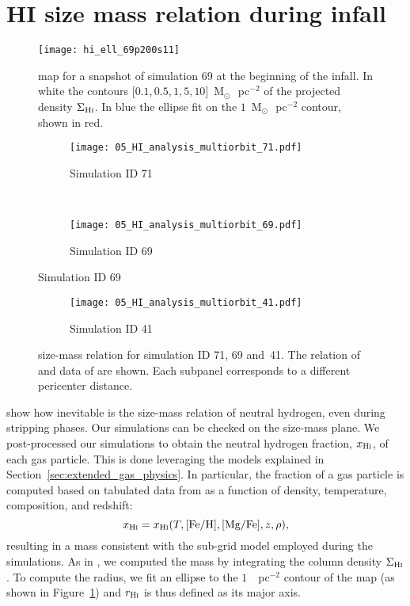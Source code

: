 \section{HI size mass relation during infall}
\begin{figure}[ht]
  \centering
  \texttt{[image: hi\_ell\_69p200s11]}
  \caption{\Hi{} map for a snapshot of simulation 69 at the beginning of the infall.
    In white the contours [$0.1, 0.5, 1, 5, 10$]~M$_\odot\,$~pc$^{-2}$ of the projected \Hi{} density $\Sigma_{\text{H\textsc{i}{}}}$.
    In blue the ellipse fit on the $1$~M$_\odot\,$~pc$^{-2}$ contour, shown in red.
  }
  \label{fig:hi_ellipse}
\end{figure}

\begin{figure}
  \centering
  \begin{subfigure}[t]{0.83\textwidth}
    \centering
    \caption{Simulation ID 71}
    \texttt{[image: 05\_HI\_analysis\_multiorbit\_71.pdf]}
  \end{subfigure}\\%
  \begin{subfigure}[t]{0.83\textwidth}
    \centering
    \caption{Simulation ID 69}
    \texttt{[image: 05\_HI\_analysis\_multiorbit\_69.pdf]}
  \end{subfigure}
  \label{fig:hi_size_mass}
\end{figure}
\begin{figure}[ht]
  \centering
  \ContinuedFloat %
  \begin{subfigure}{0.83\textwidth}
    \caption{Simulation ID 41}
    \texttt{[image: 05\_HI\_analysis\_multiorbit\_41.pdf]}
  \end{subfigure}
  \caption{\Hi{} size-mass relation for simulation ID 71, 69 and~41.
    The relation of \citet{Wang2016} and data of \citet{Papastergis2016} are shown.
    Each subpanel corresponds to a different pericenter distance.
    }
\end{figure}

\citet{Stevens2019} show how inevitable is the size-mass relation of neutral hydrogen, even during stripping phases.
Our simulations can be checked on the \Hi{} size-mass plane.
We post-processed our simulations to obtain the neutral hydrogen fraction, $x_{\text{H\textsc{i}}}$, of each gas particle.
This is done leveraging the models explained in Section~\ref{sec:extended_gas_physics}.
In particular, the \Hi{} fraction of a gas particle is computed based on tabulated data from \citet{DeRijcke2013} as a function of density, temperature, composition, and redshift:
\[x_{\text{H\textsc{i}}} = x_{\text{H\textsc{i}}}(T, [\text{Fe}/\text{H}], [\text{Mg}/\text{Fe}], z, \rho),\]
resulting in a \Hi{} mass consistent with the sub-grid model employed during the simulations.
As in \citet{Verbeke2017}, we computed the \Hi{} mass by integrating the \Hi{} column density $\Sigma_{\text{H\textsc{i}}}$.
To compute the \Hi{} radius, we fit an ellipse to the $1$~\Msun{}~pc$^{-2}$ contour of the \Hi{} map (as shown in Figure~\ref{fig:hi_ellipse}) and $r_{\text{H\textsc{i}}}$ is thus defined as its major axis.


